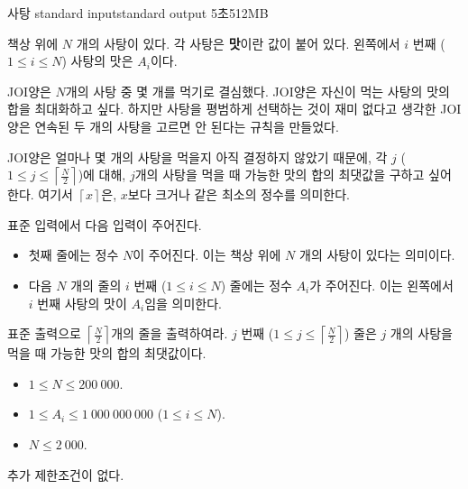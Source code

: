 \begin{problem}{사탕}
	{standard input}{standard output}
	{5초}{512MB}{}
	
	책상 위에 $N$ 개의 사탕이 있다. 각 사탕은 \textbf{맛}이란 값이 붙어 있다. 왼쪽에서 $i$ 번째 ($1 \le i \le N$) 사탕의 맛은 $A_i$이다.
	
	JOI양은 $N$개의 사탕 중 몇 개를 먹기로 결심했다. JOI양은 자신이 먹는 사탕의 맛의 합을 최대화하고 싶다. 하지만 사탕을 평범하게 선택하는 것이 재미 없다고 생각한 JOI양은 연속된 두 개의 사탕을 고르면 안 된다는 규칙을 만들었다.
	
	JOI양은 얼마나 몇 개의 사탕을 먹을지 아직 결정하지 않았기 때문에, 각 $j$ ($1 \le j \le \left\lceil \frac{N}{2} \right\rceil$)에 대해, $j$개의 사탕을 먹을 때 가능한 맛의 합의 최댓값을 구하고 싶어한다. 여기서 $\left\lceil x \right\rceil$은, $x$보다 크거나 같은 최소의 정수를 의미한다.
	
	\InputFile
	
	표준 입력에서 다음 입력이 주어진다.
	
	\begin{itemize}
		\item 첫째 줄에는 정수 $N$이 주어진다. 이는 책상 위에 $N$ 개의 사탕이 있다는 의미이다.
		\item 다음 $N$ 개의 줄의 $i$ 번째 ($1 \le i \le N$) 줄에는 정수 $A_i$가 주어진다. 이는 왼쪽에서 $i$ 번째 사탕의 맛이 $A_i$임을 의미한다.
	\end{itemize}
		
	\OutputFile
	
	표준 출력으로 $\left\lceil \frac{N}{2} \right\rceil$개의 줄을 출력하여라. $j$ 번째 ($1 \le j \le \left\lceil \frac{N}{2} \right\rceil$) 줄은 $j$ 개의 사탕을 먹을 때 가능한 맛의 합의 최댓값이다.
		
	\Constraints
	
	\begin{itemize}
		\item $1 \le N \le 200\ 000$.
		\item $1 \le A_i \le 1\ 000\ 000\ 000$ ($1 \le i \le N$).
	\end{itemize}
	
	
	\begin{itemize}
		\item $N \le 2\ 000$.
	\end{itemize}

	추가 제한조건이 없다.
	
	\Examples
	
	\begin{example}
	\end{example}
	

\end{problem}
